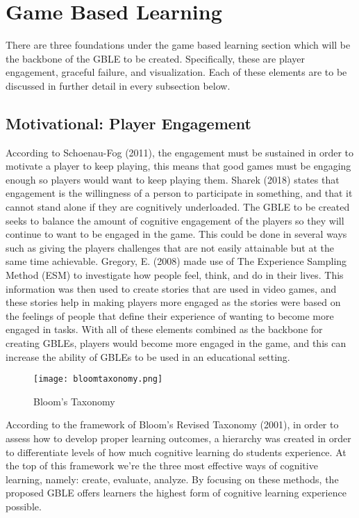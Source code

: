 \section{Game Based Learning}
There are three foundations under the game based learning section which will be the backbone of the GBLE to be created. Specifically, these are player engagement, graceful failure, and visualization. Each of these elements are to be discussed in further detail in every subsection below.

\subsection{Motivational: Player Engagement}
According to Schoenau-Fog (2011), the engagement must be sustained in order to motivate a player to keep playing, this means that good games must be engaging enough so players would want to keep playing them. Sharek (2018) states that engagement is the willingness of a person to participate in something, and that it cannot stand alone if they are cognitively underloaded. The GBLE to be created seeks to balance the amount of cognitive engagement of the players so they will continue to want to be engaged in the game. This could be done in several ways such as giving the players challenges that are not easily attainable but at the same time achievable. Gregory, E. (2008) made use of The Experience Sampling Method (ESM) to investigate how people feel, think, and do in their lives. This information was then used to create stories that are used in video games, and these stories help in making players more engaged as the stories were based on the feelings of people that define their experience of wanting to become more engaged in tasks. With all of these elements combined as the backbone for creating GBLEs, players would become more engaged in the game, and this can increase the ability of GBLEs to be used in an educational setting.

\begin{figure}[t]
   \centering                    
   \texttt{[image: bloomtaxonomy.png]}
   \caption{Bloom's Taxonomy}
    \label{fig:bloomtaxonomy}
\end{figure}

According to the framework of Bloom’s Revised Taxonomy (2001), in order to assess how to develop proper learning outcomes, a hierarchy was created in order to differentiate levels of how much cognitive learning do students experience. At the top of this framework we’re the three most effective ways of cognitive learning, namely: create, evaluate, analyze. By focusing on these methods, the proposed GBLE offers learners the highest form of cognitive learning experience possible.

